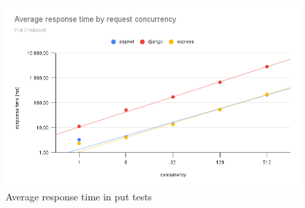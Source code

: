 \begin{figure}[H]
    \includegraphics[width=\columnwidth]{figures/pictures/resultsPut.png}
    \caption{Average response time in put tests}
    \label{fig:resultsPut}
\end{figure}
